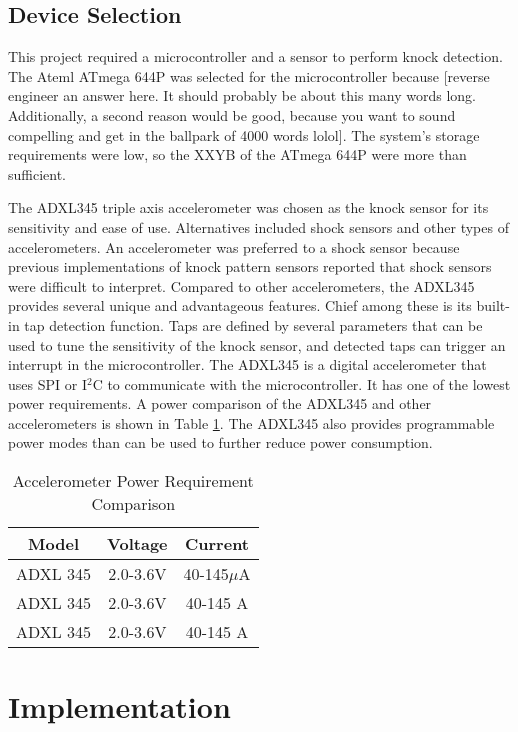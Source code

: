 \documentclass[conference]{./IEEEtran}
\begin{document}
\subsection{Device Selection}
This project required a microcontroller and a sensor to perform knock detection. The Ateml ATmega 644P was selected for the microcontroller because [reverse engineer an answer here. It should probably be about this many words long. Additionally, a second reason would be good, because you want to sound compelling and get in the ballpark of 4000 words lolol]. The system's storage requirements were low, so the XXYB of the ATmega 644P were more than sufficient.

The ADXL345 triple axis accelerometer was chosen as the knock sensor for its sensitivity and ease of use. Alternatives included shock sensors and other types of accelerometers. An accelerometer was preferred to a shock sensor because previous implementations of knock pattern sensors reported that shock sensors were difficult to interpret. Compared to other accelerometers, the ADXL345 provides several unique and advantageous features. Chief among these is its built-in tap detection function. Taps are defined by several parameters that can be used to tune the sensitivity of the knock sensor, and detected taps can trigger an interrupt in the microcontroller. The ADXL345 is a digital accelerometer that uses SPI or I$^2$C to communicate with the microcontroller. It has one of the lowest power requirements. A power comparison of the ADXL345 and other accelerometers is shown in Table \ref{table_power}. The ADXL345 also provides programmable power modes than can be used to further reduce power consumption.  

\begin{table}[!b]
\label{table_power}
\centering
\begin{tabular}{ccc}
Model & Voltage & Current\\
\hline
ADXL 345 & 2.0-3.6V & 40-145$\mu$A\\
ADXL 345 & 2.0-3.6V & 40-145 A\\
ADXL 345 & 2.0-3.6V & 40-145 A\\
\hline
\end{tabular}
\vspace{2mm}
\caption{Accelerometer Power Requirement Comparison}
\end{table}

\section{Implementation}
\end{document}
